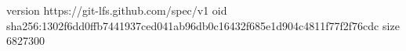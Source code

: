 version https://git-lfs.github.com/spec/v1
oid sha256:1302f6dd0ffb7441937ced041ab96db0c16432f685e1d904c4811f77f2f76cdc
size 6827300
